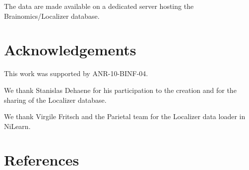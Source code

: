 \documentclass[review]{elsarticle}
\begin{document}
The data are made available on a dedicated server hosting the Brainomics/Localizer database.


\section{Acknowledgements}

This work was supported by ANR-10-BINF-04.

We thank Stanislas Dehaene for his participation to the creation and for the sharing of the Localizer database. 

We thank Virgile Fritsch and the Parietal team for the Localizer data loader in NiLearn.


\section*{References}


\end{document}
